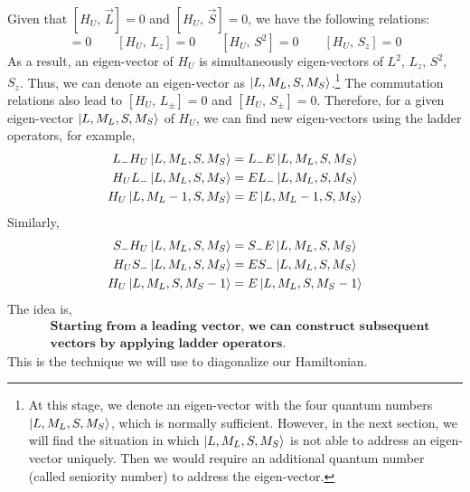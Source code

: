 Given that $[H_U,\,\vec{L}]=0$ and $[H_U,\,\vec{S}]=0$,
we have the following relations:
\begin{equation*}
[H_U,\,L^2]=0 \qquad [H_U,\,L_z]=0 \qquad
[H_U,\,S^2]=0 \qquad [H_U,\,S_z]=0
\end{equation*}
%
As a result, an eigen-vector of $H_U$ is simultaneously
eigen-vectors of $L^2$, $L_z$, $S^2$, $S_z$. Thus, we can denote
an eigen-vector as $\Ket{L, M_L, S, M_S}$.\footnote{At this stage, we
denote an eigen-vector with the four quantum numbers $\Ket{L, M_L, S, M_S}$,
which is normally sufficient.
However, in the next section, we will find the situation in which $\Ket{L, M_L, S, M_S}$
is not able to address an eigen-vector uniquely. Then we would require
an additional quantum number (called seniority number) to address the
eigen-vector.}
The commutation relations also lead to $[H_U,\,L_\pm]=0$ and $[H_U,\,S_\pm]=0$.
Therefore, for a given eigen-vector $\Ket{L, M_L, S, M_S}$ of $H_U$,
we can find new eigen-vectors using the ladder operators, for example,
\begin{align} \label{eq:LmOp}
\begin{split}
L_- H_U \Ket{L, M_L, S, M_S} & = L_- E \Ket{L, M_L, S, M_S} \\
H_U L_- \Ket{L, M_L, S, M_S} & = E L_- \Ket{L, M_L, S, M_S} \\
H_U \Ket{L, M_L-1, S, M_S} & = E \Ket{L, M_L-1, S, M_S}
\end{split}
\end{align}
Similarly,
\begin{align} \label{eq:SmOp}
\begin{split}
S_- H_U \Ket{L, M_L, S, M_S} & = S_- E \Ket{L, M_L, S, M_S} \\
H_U S_- \Ket{L, M_L, S, M_S} & = E S_- \Ket{L, M_L, S, M_S} \\
H_U \Ket{L, M_L, S, M_S-1} & = E \Ket{L, M_L, S, M_S-1}
\end{split}
\end{align}
%
The idea is,
\begin{equation}
\boxed{
\begin{aligned}
& \textbf{Starting from a leading vector, we can construct subsequent} \\
& \textbf{vectors by applying ladder operators.}
\end{aligned}
}
\end{equation}
This is the technique we will use to diagonalize our Hamiltonian.

